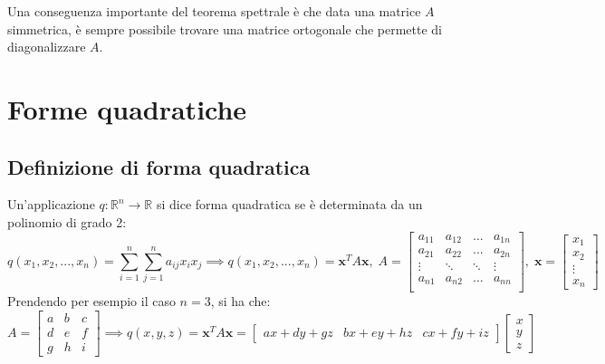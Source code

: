 \documentclass{article}
\begin{document}
    \vspace{10pt}
    Una conseguenza importante del teorema spettrale è che data una matrice $A$ simmetrica, è sempre possibile trovare una matrice ortogonale che permette di diagonalizzare $A$.








\newpage
\section{Forme quadratiche} \label{sec:quadform}
\subsection{Definizione di forma quadratica} \label{subsec:quadformdef}
    Un'applicazione $q: \mathbb{R}^{n} \rightarrow \mathbb{R}$ si dice forma quadratica se è determinata da un polinomio di grado 2:
    \[
        q(x_1, x_2, ..., x_n) = \sum_{i = 1}^{n} \sum_{j = 1}^{n} a_{ij} x_i x_j 
        \implies 
        q(x_1, x_2, ..., x_n) = \mathbf{x}^{T} A \mathbf{x}, \;
        A = \begin{bmatrix}
            a_{11} & a_{12} & ... & a_{1n} \\
            a_{21} & a_{22} & ... & a_{2n} \\
            \vdots & \ddots & \ddots & \vdots \\
            a_{n1} & a_{n2} & ... & a_{nn} \\
        \end{bmatrix}, \;
        \mathbf{x} = \begin{bmatrix}
            x_1 \\
            x_2 \\
            \vdots \\
            x_n
        \end{bmatrix} 
    \]
    Prendendo per esempio il caso $n = 3$, si ha che:
    \[
        A = \begin{bmatrix}
            a & b & c \\
            d & e & f \\
            g & h & i
        \end{bmatrix}
        \implies 
        q(x, y ,z) = \mathbf{x}^{T} A \mathbf{x} = \begin{bmatrix} ax + dy + gz & bx + ey + hz & cx + fy + iz \end{bmatrix} \begin{bmatrix} x \\ y \\ z \end{bmatrix} 
    \]
\end{document}
